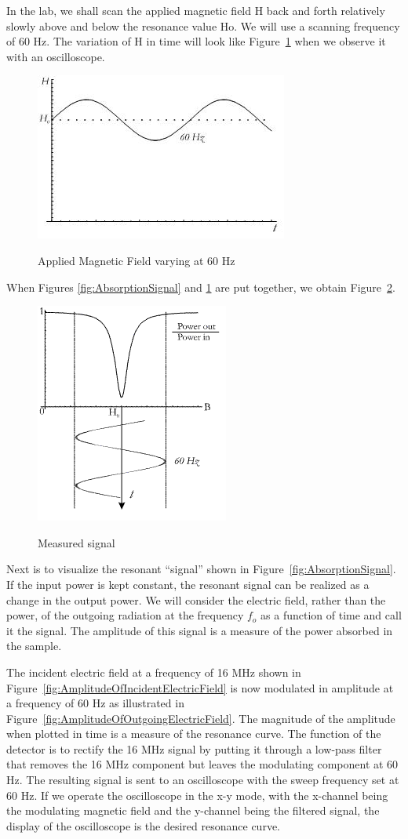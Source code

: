 \documentclass{../lab}
\begin{document}
In the lab, we shall scan the applied magnetic field H back and forth relatively slowly above and below the resonance value Ho. We will use a scanning frequency of 60 Hz. The variation of H in time will look like Figure~\ref{fig:AppliedMagneticField} when we observe it with an oscilloscope.

\begin{figure}[h]
    \centering
    \href{http://experimentationlab.berkeley.edu/sites/default/files/images/NMR5.jpg}{\includegraphics[width=0.3\linewidth]{images/NMR5.jpg}}
    \caption{Applied Magnetic Field varying at 60 Hz}
    \label{fig:AppliedMagneticField}
\end{figure}

When Figures \ref{fig:AbsorptionSignal} and \ref{fig:AppliedMagneticField} are put together, we obtain Figure~\ref{fig:MeasuredSignal}.

\begin{figure}[h]
    \centering
    \href{http://experimentationlab.berkeley.edu/sites/default/files/images/NMR6.gif}{\includegraphics[width=0.3\linewidth]{images/NMR6.png}}
    \caption{Measured signal}
    \label{fig:MeasuredSignal}
\end{figure}

Next is to visualize the resonant ``signal'' shown in Figure~\ref{fig:AbsorptionSignal}. If the input power is kept constant, the resonant signal can be realized as a change in the output power. We will consider the electric field, rather than the power, of the outgoing radiation at the frequency $f_o$ as a function of time and call it the signal. The amplitude of this signal is a measure of the power absorbed in the sample.

The incident electric field at a frequency of 16 MHz shown in Figure~\ref{fig:AmplitudeOfIncidentElectricField} is now modulated in amplitude at a frequency of 60 Hz as illustrated in Figure~\ref{fig:AmplitudeOfOutgoingElectricField}. The magnitude of the amplitude when plotted in time is a measure of the resonance curve. The function of the detector is to rectify the 16 MHz signal by putting it through a low-pass filter that removes the 16 MHz component but leaves the modulating component at 60 Hz. The resulting signal is sent to an oscilloscope with the sweep frequency set at 60 Hz. If we operate the oscilloscope in the x-y mode, with the x-channel being the modulating magnetic field and the y-channel being the filtered signal, the display of the oscilloscope is the desired resonance curve.
\end{document}
